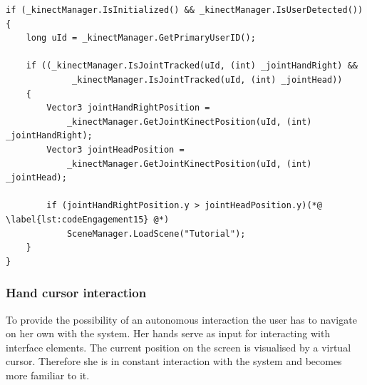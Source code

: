 \begin{lstlisting}[caption=C$^\sharp$ example code for tracking a raising hand, label=lst:codeEngagement]
if (_kinectManager.IsInitialized() && _kinectManager.IsUserDetected())
{
	long uId = _kinectManager.GetPrimaryUserID();

	if ((_kinectManager.IsJointTracked(uId, (int) _jointHandRight) && 
			 _kinectManager.IsJointTracked(uId, (int) _jointHead))
	{
		Vector3 jointHandRightPosition = 
			_kinectManager.GetJointKinectPosition(uId, (int) _jointHandRight);
		Vector3 jointHeadPosition = 
			_kinectManager.GetJointKinectPosition(uId, (int) _jointHead);			

		if (jointHandRightPosition.y > jointHeadPosition.y)(*@ \label{lst:codeEngagement15} @*)
			SceneManager.LoadScene("Tutorial");
	}
}
\end{lstlisting}

\subsubsection{Hand cursor interaction}
To provide the possibility of an autonomous interaction the user has to navigate on her own with the system. Her hands serve as input for interacting with interface elements. The current position on the screen is visualised by a virtual cursor. Therefore she is in constant interaction with the system and becomes more familiar to it.

